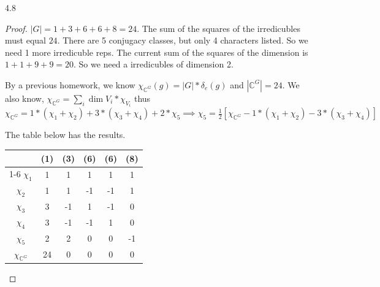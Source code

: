 \documentclass{article}
\newcommand{\C}{\mathbb{C}}
\begin{document}
\begin{PROB}{4.8}\label{Problem 4.8.}
    
\end{PROB}
\begin{proof}
    $|G| = 1 + 3 + 6 + 6 + 8 = 24$. The sum of the squares of the irredicubles must equal $24$. There are 5 conjugacy classes, but only 4 characters listed. So we need 1 more irredicuble reps. The current sum of the squares of the dimension is $1 + 1 + 9 + 9 = 20$. So we need a irredicubles of dimension 2. 
    
    By a previous homework, we know $\chi_{\C^G}(g) = |G| * \delta_e(g)$ and $|\C^G| = 24$. We also know, $\chi_{\C^G} = \sum_{i} \dim V_i * \chi_{V_i}$ thus $\chi_{\C^G} = 1 * (\chi_1 + \chi_2) + 3 * ( \chi_3 + \chi_4) + 2 * \chi_5 \implies \chi_5 = \frac{1}{2}\left[\chi_{\C^G} - 1 * (\chi_1 + \chi_2) - 3 * ( \chi_3 + \chi_4)\right]$

    The table below has the results. 
    
    \begin{tabular}{c | c c c c c }
        & (1) & (3) & (6) & (6) & (8)  \\
        \cline{1-6}
        $\chi_1$ & 1 & 1 & 1 & 1 & 1 \\
        $\chi_2$ & 1 & 1 & -1 & -1 & 1 \\
        $\chi_3$ & 3 & -1 & 1 & -1 & 0 \\
        $\chi_4$ & 3 & -1 & -1 & 1 & 0 \\
        $\chi_5$ & 2 & 2 & 0 & 0 & -1 \\
        $\chi_{\C^G}$ & 24 & 0 & 0 & 0 & 0 
    \end{tabular}
\end{proof}

\bigskip
\end{document}
